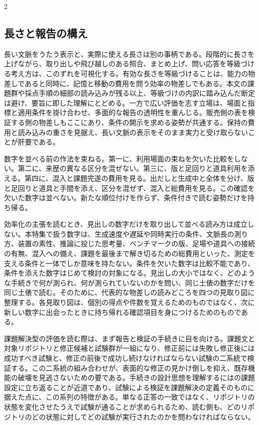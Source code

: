 \documentclass[lualatex,a4paper,10pt]{jlreq}
\begin{document}
\begin{multicols}{2}
\subsection{長さと報告の構え}
長い文脈をうたう表示と、実際に使える長さは別の事柄である\autocite{ruler}。段階的に長さを上げながら、取り出しや飛び越しのある照合、まとめ上げ、問い応答を等級づける考え方は、このずれを可視化する。有効な長さを等級づけることは、能力の物差しであると同時に、記憶と移動の費用を問う効率の物差しでもある。本文の課題群や採点手順の細部の読み込みが残る以上、等級づけの内訳に踏み込んだ断定は避け、要旨に即した理解にとどめる。一方で広い評価を志す立場は、場面と指標と適用条件を掛け合わせ、多面的な報告の透明性を重んじる\autocite{helm}。販売側の表を検証する側の物差しもここにあり、条件の開示を求める姿勢が共通する。保持の費用と読み込みの重さを見据え、長い文脈の表示をそのまま実力と受け取らないことが肝要である。

数字を並べる前の作法を束ねる。第一に、利用場面の束ねを欠いた比較をしない。第二に、来歴の異なる区分を混ぜない。第三に、版と足回りと道具利用を添える。第四に、混入と課題完遂の費用を見る。出だしと生成中と全体を分け、版と足回りと道具と手間を添え、区分を混ぜず、混入と総費用を見る。この確認を欠いた数字は並べない。新たな順位付けを作らず、条件付きで読む姿勢だけを持ち帰る。

効率化の主張を読むとき、見出しの数字だけを取り出して並べる読み方は成立しない。本特集で扱う数字は、生成速度や遅延や同時実行の条件、文脈長の測り方、装置の素性、推論に投じた思考量、ベンチマークの版、足場や道具への接続の有無、混入への備え、課題を最後まで解き切るための総費用といった、測定を支える条件と一体でしか意味を持たない。条件を欠いた数字は比較不能であり、条件を添えた数字はじめて検討の対象になる。見出しの大小ではなく、どのような手続きで何が測られ、何が測られていないのかを問い、同じ土俵の数字だけを同じ土俵で読む。そのために、代表的な物差しの読みどころを四つの見取り図に整理する。各見取り図は、個別の得点や件数を覚えるためのものではなく、次に新しい数字に出会ったときに持ち帰れる確認項目を身につけるためのものである。

\begin{technicalnote}
課題解決型の評価を読む際は、まず報告と検証の手続きに目を向ける。課題文と対象リポジトリと修正候補と試験群が一組になり、修正前には失敗し修正後には成功すべき試験と、修正の前後で成功し続けなければならない試験の二系統で検証する。この二系統の組み合わせが、表面的な修正の見かけ倒しを抑え、既存機能の破壊を見逃さないための要である。手続きの設計思想を理解するには\autocite{swebench}の課題設定に立ち返ることが近道であり、試験による検証を課題解決の定義そのものに据えた点に、この系列の特徴がある。単なる正答の一致ではなく、リポジトリの状態を変化させたうえで試験が通ることが求められるため、読む側も、どのリポジトリのどの状態に対してどの試験が実行されたのかを問わなければならない。


\end{technicalnote}
\end{multicols}
\end{document}

